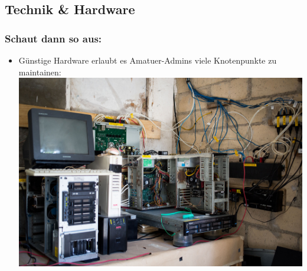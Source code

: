 \subsection{Technik \& Hardware}

\begin{frame}
\frametitle{Schaut dann so aus:}
	\begin{itemize}
		\item Günstige Hardware erlaubt es Amatuer-Admins viele Knotenpunkte zu maintainen:
			\includegraphics[width=\textwidth]{images/snet_pillar.jpg}
	\end{itemize}
\end{frame}
